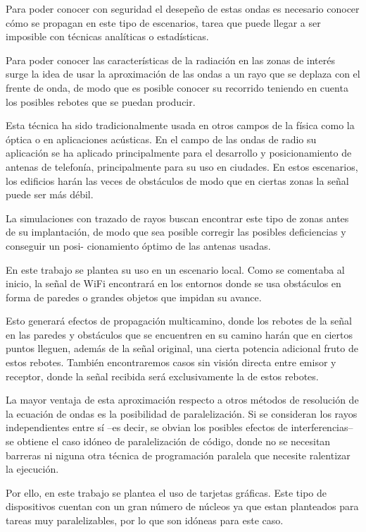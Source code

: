 Para poder conocer con seguridad el desepeño de estas ondas es necesario conocer cómo se propagan en este tipo de escenarios, tarea que puede llegar a ser imposible con técnicas analíticas o estadísticas.

Para poder conocer las características de la radiación en las zonas de interés surge la idea de usar la aproximación de las ondas a un rayo que se deplaza con el frente de onda, de modo que es posible conocer su recorrido teniendo en cuenta los posibles rebotes que se puedan producir. 

Esta técnica ha sido tradicionalmente usada en otros campos de la física como la óptica o en aplicaciones acústicas.
En el campo de las ondas de radio su aplicación se ha aplicado principalmente para el desarrollo y posicionamiento de antenas de telefonía, principalmente para su uso en ciudades. En estos escenarios, los edificios harán las veces de obstáculos de modo que en ciertas zonas la señal puede ser más débil. 

La simulaciones con trazado de rayos buscan encontrar este tipo de zonas antes de su implantación, de modo que sea posible corregir las posibles deficiencias y conseguir un posi- cionamiento óptimo de las antenas usadas.

En este trabajo se plantea su uso en un escenario local. Como se comentaba al inicio, la señal de WiFi encontrará en los entornos donde se usa obstáculos en forma de paredes o grandes objetos que impidan su avance.

Esto generará efectos de propagación multicamino, donde los rebotes de la señal en las paredes y obstáculos que se encuentren en su camino harán que en ciertos puntos lleguen, además de la señal original, una cierta potencia adicional fruto de estos rebotes.
También encontraremos casos sin visión directa entre emisor y receptor, donde la señal recibida será exclusivamente la de estos rebotes.

La mayor ventaja de esta aproximación respecto a otros métodos de resolución de la ecuación de ondas es la posibilidad de paralelización.
Si se consideran los rayos independientes entre sí --es decir, se obvian los posibles efectos de interferencias-- se obtiene el caso idóneo de paralelización de código, donde no se necesitan barreras ni niguna otra técnica de programación paralela que necesite ralentizar la ejecución.

Por ello, en este trabajo se plantea el uso de tarjetas gráficas.
Este tipo de dispositivos cuentan con un gran número de núcleos ya que estan planteados para tareas muy paralelizables, por lo que son idóneas para este caso.

